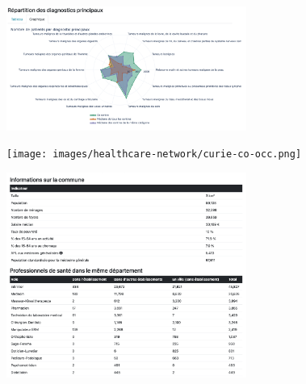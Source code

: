\begin{figure}[H]
    \includegraphics[width=0.7\textwidth]{images/healthcare-network/curie-dp.png}
    \centering
    \caption{}
    \label{fig:hn-curie-dp}
\end{figure}


\begin{figure}[H]
    \texttt{[image: images/healthcare-network/curie-co-occ.png]}
    \centering
    \caption{}
    \label{fig:hn-curie-co-occ}
\end{figure}


\begin{figure}[H]
    \includegraphics[width=0.7\textwidth]{images/healthcare-network/curie-commune.png}
    \centering
    \caption{}
    \label{fig:hn-curie-commune}
\end{figure}
